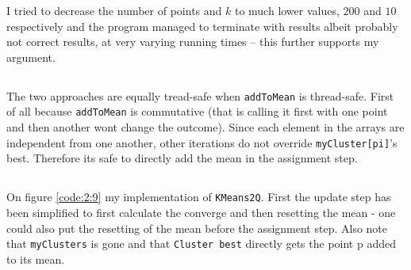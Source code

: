 I tried to decrease the number of points and $k$ to much lower values, $200$ and $10$ respectively and the program managed to terminate with results albeit probably not correct results, at very varying running times -- this further supports my argument.



\subsection{}
The two approaches are equally tread-safe when \texttt{addToMean} is thread-safe. First of all because \texttt{addToMean} is commutative (that is calling it first with one point and then another wont change the outcome). Since each element in the arrays are independent from one another, other iterations do not override \texttt{myCluster[pi]}'s best. Therefore its safe to directly add the mean in the assignment step.

\subsection{}
On figure \ref{code:2:9} my implementation of \texttt{KMeans2Q}. First the update step has been simplified to first calculate the converge and then resetting the mean - one could also put the resetting of the mean before the assignment step. Also note that \texttt{myClusters} is gone and that \texttt{Cluster best} directly gets the point p added to its mean.

